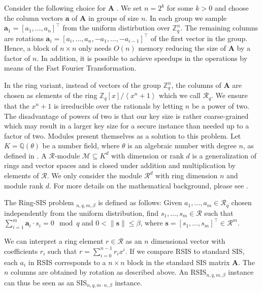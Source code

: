 Consider the following choice for $\mathbf{A}$ . We set $n=2^k$ for some $k > 0$ and choose the column vectors $\mathbf{a}$ of $\mathbf{A}$ in groups of size $n$. In each group we sample $\mathbf{a}_1 = [a_1, \ldots, a_n]^\intercal$ from the uniform distirbution over $\mathbb{Z}_q^{n}$. The remaining columns are rotations $\mathbf{a}_i = [a_i, \ldots, a_n, -a_1, \ldots, -a_{i-1}]^\intercal$ of the first vector in the group. Hence, a block of $n\times n$ only needs $O(n)$ memory reducing the size of $\mathbf{A}$ by a factor of $n$. In addition, it is possible to achieve speedups in the operations by means of the Fast Fourier Transformation.

In the ring variant, instead of vectors of the group $\mathbb{Z}_q^n$, the columns of $\mathbf{A}$ are chosen as elements of the ring $\mathbb{Z}_q\left[x\right] / \left\langle x^n + 1 \right\rangle$ which we call $\mathcal{R}_q$. We ensure that the  $x^n + 1$ is irreducible over the rationals by letting $n$ be a power of two. The disadvantage of powers of two is that our key size is rather coarse-grained which may result in a larger key size for a secure instance than needed up to a factor of two. Modules present themselves as a solution to this problem. Let $K=\mathbb{Q}(\theta)$ be a number field, where $\theta$ is an algebraic number with degree $n$, as defined in \cite{LS15}. A $\mathcal{R}$-module $\mathcal{M} \subseteq K^d$ with dimension or rank $d$ is a generalization of rings and vector spaces and is closed under addition and multiplication by elements of $\mathcal{R}$. We only consider the module $\mathcal{R}^d$ with ring dimension $n$ and module rank $d$. For more details on the mathematical background, please see \cite{LS15}. %


\begin{definition}
    The Ring-SIS problem $_{n, q, m, \beta}$ is defined as follows: Given $a_1, \ldots, a_m \in \mathcal{R}_q$ chosen independently from the uniform distribution, find $s_1, \ldots, s_m \in \mathcal{R}$ such that $\sum_{i=1}^m \mathbf{a}_i \cdot s_i = 0 \mod q$ and $0 < \| \mathbf{s}\| \leq \beta$, where $\mathbf{s} = \left[s_1, \ldots, s_m\right]^\intercal \in \mathcal{R}^m$.
\end{definition} %
We can interpret a ring element $r \in \mathcal{R}$ as an $n$ dimensional vector with coefficients $r_i$ such that $r = \sum_{i=0}^{n-1} r_i x^i$. If we compare RSIS to standard SIS, each $a_i$ in RSIS corresponds to a $n\times n$ block in the standard SIS matrix $\mathbf{A}$. The $n$ columns are obtained by rotation as described above. An RSIS$_{n, q, m, \beta}$ instance can thus be seen as an SIS$_{n, q, m \cdot n, \beta}$ instance.

